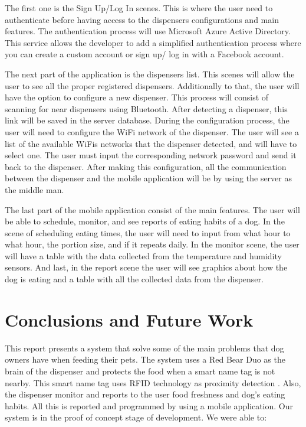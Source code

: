 \documentclass[12pt]{article}
\begin{document}
The first one is the Sign Up/Log In scenes. This is where the user need to authenticate before having access to the dispensers configurations and main features. The authentication process will use Microsoft Azure Active Directory\cite{Vilcinskas2016}. This service allows the developer to add a simplified authentication process where you can create a custom account or sign up/ log in with a Facebook account.

The next part of the application is the dispensers list. This scenes will allow the user to see all the proper registered dispensers. Additionally to that, the user will have the option to configure a new dispenser. This process will consist of scanning for near dispensers using Bluetooth. After detecting a dispenser, this link will be saved in the server database. During the configuration process, the user will need to configure the  WiFi network of the dispenser. The user will see a list of the available WiFis networks that the dispenser detected, and will have to select one. The user must input the corresponding network password and send it back to the dispenser. After making this configuration, all the communication between the dispenser and the mobile application will be by using the server as the middle man.

The last part of the mobile application consist of the main features. The user will be able to schedule, monitor, and see reports of eating habits of a dog. In the scene of scheduling eating times, the user will need to input from what hour to what hour, the portion size, and if it repeats daily. In the monitor scene, the user will have a table with the data collected from the temperature and humidity sensors. And last, in the report scene the user will see graphics about how the dog is eating and a table with all the collected data from the dispenser.


\section{Conclusions and Future Work}

This report presents a system that solve some of the main problems that dog owners have when feeding their pets. The system uses a Red Bear Duo as the brain of the dispenser and protects the food when a smart name tag is not nearby. This smart name tag uses RFID technology as proximity detection . Also, the dispenser monitor and reports to the user food freshness and dog's eating habits. All this is reported and programmed by using a mobile application. Our system is in the proof of concept stage of development. We were able to:
\end{document}
